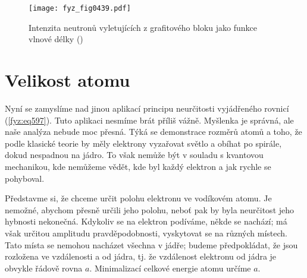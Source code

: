     \begin{figure}[ht!] %
      \centering
      \texttt{[image: fyz\_fig0439.pdf]}
      \caption{Intenzita neutronů vyletujících z grafitového bloku jako funkce vlnové délky
              (\cite[s.~516]{Feynman01})}
      \label{fyz:fig0439}
    \end{figure}

  \section{Velikost atomu}\label{fyz:IchapXXXVIIIsecIV}
    Nyní se zamyslíme nad jinou aplikací principu neurčitosti vyjádřeného rovnicí (\ref{fyz:eq597}).
    Tuto aplikaci nesmíme brát příliš vážně. Myšlenka je správná, ale naše analýza nebude moc
    přesná. Týká se demonstrace rozměrů atomů a toho, že podle klasické teorie by měly elektrony
    vyzařovat světlo a obíhat po spirále, dokud nespadnou na jádro. To však nemůže být v souladu s
    kvantovou mechanikou, kde nemůžeme vědět, kde byl každý elektron a jak rychle se pohyboval. 

    Představme si, že chceme určit polohu elektronu ve vodíkovém atomu. Je nemožné, abychom přesně
    určili jeho polohu, neboť pak by byla neurčitost jeho hybnosti nekonečná. Kdykoliv se na
    elektron podíváme, někde se nachází; má však určitou amplitudu pravděpodobnosti, vyskytovat se
    na různých místech. Tato místa se nemohou nacházet všechna v jádře; budeme předpokládat, že jsou
    rozložena ve vzdálenosti a od jádra, tj. že vzdálenost elektronu od jádra je obvykle řádově
    rovna \(a\). Minimalizací celkové energie atomu určíme \(a\). 
    
